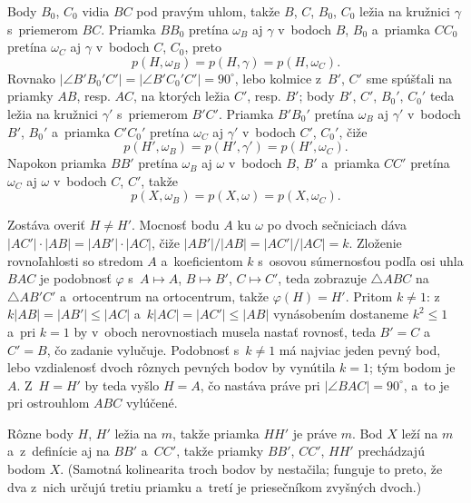 {    Body $B_0$, $C_0$ vidia $BC$ pod pravým uhlom, takže $B$, $C$, $B_0$, $C_0$ ležia na kružnici $\gamma$ s~priemerom $BC$. Priamka $BB_0$ pretína $\omega_B$ aj $\gamma$ v~bodoch $B$, $B_0$ a~priamka $CC_0$ pretína $\omega_C$ aj $\gamma$ v~bodoch $C$, $C_0$, preto
    $$
    p(H,\omega_B) = p(H,\gamma) = p(H,\omega_C).
    $$
    Rovnako $|\angle B'B_0'C'| = |\angle B'C_0'C'| = 90^\circ$, lebo kolmice z~$B'$, $C'$ sme spúšťali na priamky $AB$, resp. $AC$, na ktorých ležia $C'$, resp. $B'$; body $B'$, $C'$, $B_0'$, $C_0'$ teda ležia na kružnici $\gamma'$ s~priemerom $B'C'$. Priamka $B'B_0'$ pretína $\omega_B$ aj $\gamma'$ v~bodoch $B'$, $B_0'$ a~priamka $C'C_0'$ pretína $\omega_C$ aj $\gamma'$ v~bodoch $C'$, $C_0'$, čiže
    $$
    p(H',\omega_B) = p(H',\gamma') = p(H',\omega_C).
    $$
    Napokon priamka $BB'$ pretína $\omega_B$ aj $\omega$ v~bodoch $B$, $B'$ a~priamka $CC'$ pretína $\omega_C$ aj $\omega$ v~bodoch $C$, $C'$, takže
    $$
    p(X,\omega_B) = p(X,\omega) = p(X,\omega_C).
    $$

    Zostáva overiť $H \neq H'$. Mocnosť bodu $A$ ku $\omega$ po dvoch sečniciach dáva $|AC'| \cdot |AB| = |AB'| \cdot |AC|$, čiže $|AB'|/|AB| = |AC'|/|AC| = k$. Zloženie rovnoľahlosti so stredom $A$ a~koeficientom $k$ s~osovou súmernosťou podľa osi uhla $BAC$ je podobnosť $\varphi$ s~$A \mapsto A$, $B \mapsto B'$, $C \mapsto C'$, teda zobrazuje $\triangle ABC$ na $\triangle AB'C'$ a~ortocentrum na ortocentrum, takže $\varphi(H) = H'$. Pritom $k \neq 1$: z~$k|AB| = |AB'| \leq |AC|$ a~$k|AC| = |AC'| \leq |AB|$ vynásobením dostaneme $k^2 \leq 1$ a~pri $k = 1$ by v~oboch nerovnostiach musela nastať rovnosť, teda $B' = C$ a~$C' = B$, čo zadanie vylučuje. Podobnosť s~$k \neq 1$ má najviac jeden pevný bod, lebo vzdialenosť dvoch rôznych pevných bodov by vynútila $k = 1$; tým bodom je $A$. Z~$H = H'$ by teda vyšlo $H = A$, čo nastáva práve pri $|\angle BAC| = 90^\circ$, a~to je pri ostrouhlom $ABC$ vylúčené.

    Rôzne body $H$, $H'$ ležia na $m$, takže priamka $HH'$ je práve $m$. Bod $X$ leží na $m$ a~z~definície aj na $BB'$ a~$CC'$, takže priamky $BB'$, $CC'$, $HH'$ prechádzajú bodom $X$. (Samotná kolinearita troch bodov by nestačila; funguje to preto, že dva z~nich určujú tretiu priamku a~tretí je priesečníkom zvyšných dvoch.)
}

